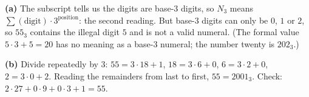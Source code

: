 \textbf{(a)} The subscript tells us the digits are base-$3$ digits, so $N_3$ means $\sum(\text{digit})\cdot3^{\text{position}}$: the second reading. But base-$3$ digits can only be $0$, $1$ or $2$, so $55_3$ contains the illegal digit $5$ and is not a valid numeral. (The formal value $5\cdot3+5=20$ has no meaning as a base-$3$ numeral; the number twenty is $202_3$.)

\textbf{(b)} Divide repeatedly by $3$: $55=3\cdot18+1$, $18=3\cdot6+0$, $6=3\cdot2+0$, $2=3\cdot0+2$. Reading the remainders from last to first, $55=\boxed{2001_3}$. Check: $2\cdot27+0\cdot9+0\cdot3+1=55$.
